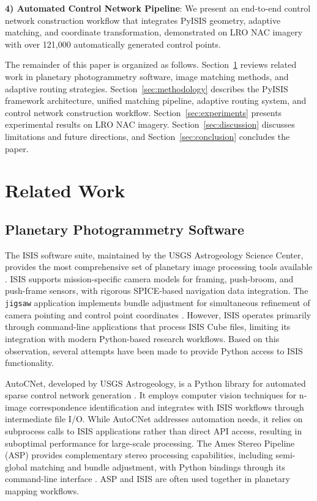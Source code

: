 \documentclass[lettersize,journal]{IEEEtran}
\newcommand{\pyisis}{PyISIS}
\begin{document}
\textbf{4) Automated Control Network Pipeline}: We present an end-to-end control network construction workflow that integrates \pyisis{} geometry, adaptive matching, and coordinate transformation, demonstrated on LRO NAC imagery with over 121,000 automatically generated control points.

The remainder of this paper is organized as follows. Section~\ref{sec:related} reviews related work in planetary photogrammetry software, image matching methods, and adaptive routing strategies. Section~\ref{sec:methodology} describes the \pyisis{} framework architecture, unified matching pipeline, adaptive routing system, and control network construction workflow. Section~\ref{sec:experiments} presents experimental results on LRO NAC imagery. Section~\ref{sec:discussion} discusses limitations and future directions, and Section~\ref{sec:conclusion} concludes the paper.


\section{Related Work}\label{sec:related}

\subsection{Planetary Photogrammetry Software}

The ISIS software suite, maintained by the USGS Astrogeology Science Center, provides the most comprehensive set of planetary image processing tools available \cite{usgs2024isis}. ISIS supports mission-specific camera models for framing, push-broom, and push-frame sensors, with rigorous SPICE-based navigation data integration. The \texttt{jigsaw} application implements bundle adjustment for simultaneous refinement of camera pointing and control point coordinates \cite{edmundson2012jigsaw}. However, ISIS operates primarily through command-line applications that process ISIS Cube files, limiting its integration with modern Python-based research workflows. Based on this observation, several attempts have been made to provide Python access to ISIS functionality.

AutoCNet, developed by USGS Astrogeology, is a Python library for automated sparse control network generation \cite{laura2018autocnet}. It employs computer vision techniques for n-image correspondence identification and integrates with ISIS workflows through intermediate file I/O. While AutoCNet addresses automation needs, it relies on subprocess calls to ISIS applications rather than direct API access, resulting in suboptimal performance for large-scale processing. The Ames Stereo Pipeline (ASP) provides complementary stereo processing capabilities, including semi-global matching and bundle adjustment, with Python bindings through its command-line interface \cite{mcmichael2024asp}. ASP and ISIS are often used together in planetary mapping workflows.
\end{document}
